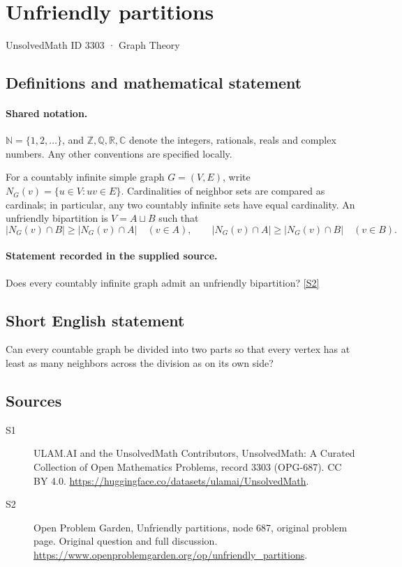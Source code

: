 \documentclass[11pt]{article}
\newcommand{\sref}[2]{\hyperlink{source:#1:#2}{[S#2]}}
\begin{document}
\setcounter{section}{3302}
\section{Unfriendly partitions}\label{3303}
{\small\sffamily UnsolvedMath ID 3303 · Graph Theory}
\subsection{Definitions and mathematical statement}

\paragraph{Shared notation.}$\mathbb N=\{1,2,\ldots\}$, and $\mathbb Z,\mathbb Q,\mathbb R,\mathbb C$ denote the integers, rationals, reals and complex numbers. Any other conventions are specified locally.


For a countably infinite simple graph $G=(V,E)$, write $N_G(v)=\{u\in V:uv\in E\}$. Cardinalities of neighbor sets are compared as cardinals; in particular, any two countably infinite sets have equal cardinality. An unfriendly bipartition is $V=A\sqcup B$ such that\[ |N_G(v)\cap B|\geq |N_G(v)\cap A|\quad(v\in A),\qquad |N_G(v)\cap A|\geq |N_G(v)\cap B|\quad(v\in B). \]
\paragraph{Statement recorded in the supplied source.}
Does every countably infinite graph admit an unfriendly bipartition? \sref{3303}{2}
\subsection{Short English statement}
Can every countable graph be divided into two parts so that every vertex has at least as many neighbors across the division as on its own side?
\subsection{Sources}
\begin{description}
\item[\hypertarget{source:3303:1}{S1}] ULAM.AI and the UnsolvedMath Contributors, UnsolvedMath: A Curated Collection of Open Mathematics Problems, record 3303 (OPG-687). CC BY 4.0. \url{https://huggingface.co/datasets/ulamai/UnsolvedMath}.
\item[\hypertarget{source:3303:2}{S2}] Open Problem Garden, Unfriendly partitions, node 687, original problem page. Original question and full discussion. \url{https://www.openproblemgarden.org/op/unfriendly_partitions}.

\end{description}
\label{end:3303}
\end{document}
